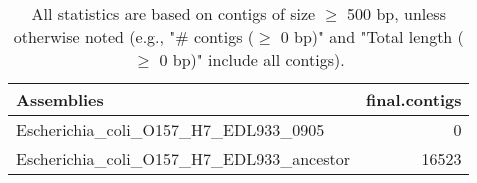 \documentclass[12pt,a4paper]{article}
\begin{document}
\begin{table}[ht]
\begin{center}
\caption{All statistics are based on contigs of size $\geq$ 500 bp, unless otherwise noted (e.g., "\# contigs ($\geq$ 0 bp)" and "Total length ($\geq$ 0 bp)" include all contigs).}
\begin{tabular}{|l*{1}{|r}|}
\hline
Assemblies & final.contigs \\ \hline
Escherichia\_coli\_O157\_H7\_EDL933\_0905 & 0 \\ \hline
Escherichia\_coli\_O157\_H7\_EDL933\_ancestor & 16523 \\ \hline
\end{tabular}
\end{center}
\end{table}
\end{document}
